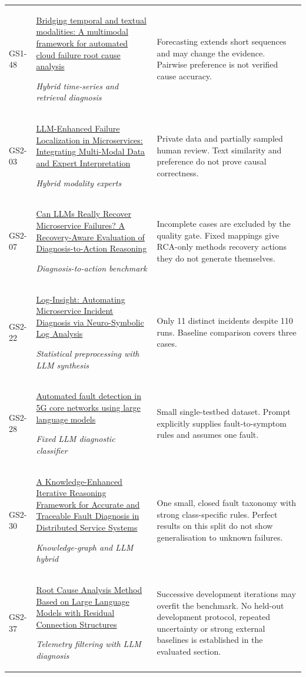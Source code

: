 \begin{longtable}{@{}p{}p{}p{}@{}}
GS1-48 & \href{https://arxiv.org/pdf/2601.04709}{Bridging temporal and textual modalities: A multimodal framework for automated cloud failure root cause analysis}\par\emph{Hybrid time-series and retrieval diagnosis} & Forecasting extends short sequences and may change the evidence. Pairwise preference is not verified cause accuracy. \\
GS2-03 & \href{https://nkcs.iops.ai/wp-content/uploads/2026/03/LocaleXpert.pdf}{LLM-Enhanced Failure Localization in Microservices: Integrating Multi-Modal Data and Expert Interpretation}\par\emph{Hybrid modality experts} & Private data and partially sampled human review. Text similarity and preference do not prove causal correctness. \\
GS2-07 & \href{https://arxiv.org/pdf/2607.04623}{Can LLMs Really Recover Microservice Failures? A Recovery-Aware Evaluation of Diagnosis-to-Action Reasoning}\par\emph{Diagnosis-to-action benchmark} & Incomplete cases are excluded by the quality gate. Fixed mappings give RCA-only methods recovery actions they do not generate themselves. \\
GS2-22 & \href{https://arxiv.org/pdf/2607.08529}{Log-Insight: Automating Microservice Incident Diagnosis via Neuro-Symbolic Log Analysis}\par\emph{Statistical preprocessing with LLM synthesis} & Only 11 distinct incidents despite 110 runs. Baseline comparison covers three cases. \\
GS2-28 & \href{https://arxiv.org/pdf/2512.19697}{Automated fault detection in 5G core networks using large language models}\par\emph{Fixed LLM diagnostic classifier} & Small single-testbed dataset. Prompt explicitly supplies fault-to-symptom rules and assumes one fault. \\
GS2-30 & \href{https://www.mdpi.com/1424-8220/26/17/5571/pdf}{A Knowledge-Enhanced Iterative Reasoning Framework for Accurate and Traceable Fault Diagnosis in Distributed Service Systems}\par\emph{Knowledge-graph and LLM hybrid} & One small, closed fault taxonomy with strong class-specific rules. Perfect results on this split do not show generalisation to unknown failures. \\
GS2-37 & \href{https://arxiv.org/pdf/2602.08804}{Root Cause Analysis Method Based on Large Language Models with Residual Connection Structures}\par\emph{Telemetry filtering with LLM diagnosis} & Successive development iterations may overfit the benchmark. No held-out development protocol, repeated uncertainty or strong external baselines is established in the evaluated section. \\

\end{longtable}
